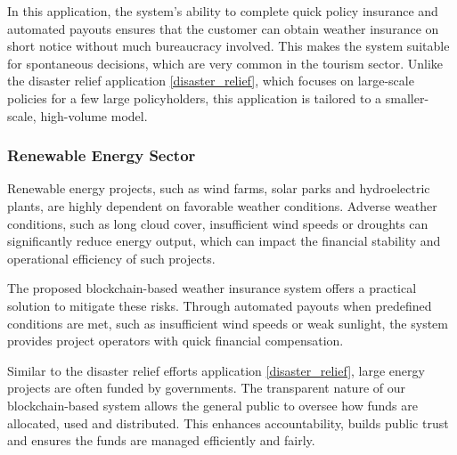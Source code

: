In this application, the system's ability to complete quick policy insurance and automated payouts ensures that the customer can obtain weather insurance on short notice without much bureaucracy involved. This makes the system suitable for spontaneous decisions, which are very common in the tourism sector. Unlike the disaster relief application \cref{disaster_relief}, which focuses on large-scale policies for a few large policyholders, this application is tailored to a smaller-scale, high-volume model.

\subsubsection{Renewable Energy Sector}
Renewable energy projects, such as wind farms, solar parks and hydroelectric plants, are highly dependent on favorable weather conditions. Adverse weather conditions, such as long cloud cover, insufficient wind speeds or droughts can significantly reduce energy output, which can impact the financial stability and operational efficiency of such projects.

The proposed blockchain-based weather insurance system offers a practical solution to mitigate these risks. Through automated payouts when predefined conditions are met, such as insufficient wind speeds or weak sunlight, the system provides project operators with quick financial compensation.

Similar to the disaster relief efforts application \cref{disaster_relief}, large energy projects are often funded by governments. The transparent nature of our blockchain-based system allows the general public to oversee how funds are allocated, used and distributed. This enhances accountability, builds public trust and ensures the funds are managed efficiently and fairly.